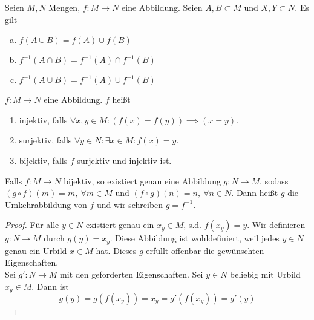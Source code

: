     \begin{lemma}
        Seien $M,N$ Mengen, $f:M\to N$ eine Abbildung. Seien $A,B\subset M$ und $X,Y\subset N$. Es gilt
        \begin{enumerate}[(a)]
            \item $f(A\cup B)=f(A)\cup f(B)$
            \item $f^{-1}(A\cap B) = f^{-1}(A)\cap f^{-1}(B)$
            \item $f^{-1}(A\cup B) = f^{-1}(A)\cup f^{-1}(B)$
        \end{enumerate}
    \end{lemma}
    \begin{defn} $f:M\to N$ eine Abbildung. $f$ heißt 
        \begin{enumerate}
            \item injektiv, falls $\forall x,y\in M: (f(x)=f(y)) \implies (x=y)$.
            \item surjektiv, falls $\forall y\in N : \exists x\in M : f(x)=y$.
            \item bijektiv, falls $f$ surjektiv und injektiv ist.
        \end{enumerate}
    \end{defn}
    \begin{lemma}
        Falls $f:M\to N$ bijektiv, so existiert genau eine Abbildung $g:N\to M$, sodass $(g\circ f)(m)=m, \ \forall m\in M$ und $(f\circ g)(n)=n, \ \forall n\in N$. Dann heißt $g$ die Umkehrabbildung
        von $f$ und wir schreiben $g=f^{-1}$.
    \end{lemma}
    \begin{proof}
        Für alle $y\in N$ existiert genau ein $x_y\in M$, s.d. $f(x_y)=y$. Wir definieren $g:N\to M$ durch $g(y)=x_y$. Diese Abbildung ist wohldefiniert,
        weil jedes $y\in N$ genau ein Urbild $x\in M$ hat. Dieses $g$ erfüllt offenbar die gewünschten Eigenschaften.\\ 
        Sei $g':N\to M$ mit den geforderten Eigenschaften. Sei $y\in N$ beliebig mit Urbild $x_y\in M$. Dann ist 
        \[
        g(y) = g(f(x_y)) = x_y = g'(f(x_y)) = g'(y)  
        \]
    \end{proof}
